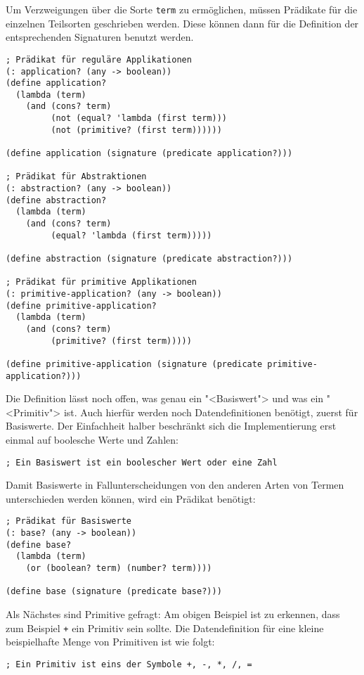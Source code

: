 Um Verzweigungen über die Sorte \lstinline{term} zu ermöglichen, müssen
Prädikate für die einzelnen Teilsorten geschrieben werden.  Diese
können dann für die Definition der entsprechenden Signaturen benutzt
werden.
%
\begin{lstlisting}
; Prädikat für reguläre Applikationen
(: application? (any -> boolean))
(define application?
  (lambda (term)
    (and (cons? term)
         (not (equal? 'lambda (first term)))
         (not (primitive? (first term))))))

(define application (signature (predicate application?)))

; Prädikat für Abstraktionen
(: abstraction? (any -> boolean))
(define abstraction?
  (lambda (term)
    (and (cons? term)
         (equal? 'lambda (first term)))))

(define abstraction (signature (predicate abstraction?)))

; Prädikat für primitive Applikationen
(: primitive-application? (any -> boolean))
(define primitive-application?
  (lambda (term)
    (and (cons? term)
         (primitive? (first term)))))

(define primitive-application (signature (predicate primitive-application?)))
\end{lstlisting}
%
Die Definition lässt noch offen, was genau ein "<Basiswert"> und was ein
"<Primitiv"> ist.  Auch hierfür werden noch Datendefinitionen
benötigt, zuerst für Basiswerte.  Der Einfachheit halber beschränkt
sich die Implementierung erst einmal auf boolesche Werte und Zahlen:
%
\begin{lstlisting}
; Ein Basiswert ist ein boolescher Wert oder eine Zahl
\end{lstlisting}
%
Damit Basiswerte in Fallunterscheidungen von den anderen Arten von
Termen unterschieden werden können, wird ein Prädikat benötigt:
%
\begin{lstlisting}
; Prädikat für Basiswerte
(: base? (any -> boolean))
(define base?
  (lambda (term)
    (or (boolean? term) (number? term))))

(define base (signature (predicate base?)))
\end{lstlisting}
%
Als Nächstes sind Primitive gefragt: Am obigen Beispiel ist zu
erkennen, dass zum Beispiel \lstinline{+} ein Primitiv sein sollte.  Die
Datendefinition für eine kleine beispielhafte Menge von Primitiven ist
wie folgt:
%
\begin{lstlisting}
; Ein Primitiv ist eins der Symbole +, -, *, /, =
\end{lstlisting}
